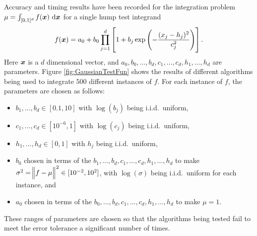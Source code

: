 \documentclass{iitthesis}
\begin{document}
\label{subsec:meanmcabssinglehump}
Accuracy and timing results have been recorded for the integration problem $\mu=\int_{[0,1]^d} f(\vx) \, \dif \vx$ for a single hump test integrand
\begin{equation} \label{GaussianTestFun}
f(\boldsymbol{x})=a_0 + b_0\prod_{j=1}^d\left[ 1 +b_j \exp \left(-\frac{(x_j-h_j)^2}{c_j^2}\right) \right].
\end{equation}
Here $\boldsymbol{x}$ is a $d$ dimensional vector, and $a_0, b_0, \ldots, b_d, c_1, \ldots, c_d, h_1, \ldots, h_d$ are parameters. Figure \ref{fig:GaussianTestFun} shows the results of different algorithms being used to integrate $500$ different instances of $f$.  For each instance of $f$, the parameters are chosen as follows:
\begin{itemize} 
\item $b_1, \ldots, b_d \in [0.1,10]$ with $\log(b_j)$ being i.i.d.\ uniform,
\item $c_1, \ldots, c_d \in [10^{-6},1]$ with $\log(c_j)$ being i.i.d.\ uniform,
\item $h_1, \ldots, h_d \in [0,1]$ with $h_j$ being i.i.d.\ uniform,
\item $b_0$ chosen in terms of the $b_1, \ldots, b_d, c_1, \ldots, c_d, h_1, \ldots, h_d$ to make $\sigma^2 =\norm[2]{f-\mu}^2 \in [10^{-2}, 10^2]$, with $\log(\sigma)$ being i.i.d.\ uniform for each instance, and
\item $a_0$ chosen in terms of the $b_0, \ldots, b_d, c_1, \ldots, c_d, h_1, \ldots, h_d$ to make $\mu=1$.
\end{itemize}
These ranges of parameters are chosen so that the algorithms being tested fail to meet the error tolerance a significant number of times.
\end{document}
